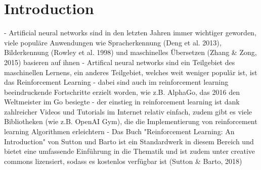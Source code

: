 \chapter{Introduction}

- Artificial neural networks sind in den letzten Jahren immer wichtiger geworden, viele populäre Anwendungen wie Spracherkennung (Deng et al. 2013), Bilderkennung (Rowley et al. 1998) und maschinelles Übersetzen (Zhang & Zong, 2015) basieren auf ihnen %
- Artifical neural networks sind ein Teilgebiet des maschinellen Lernens, ein anderes Teilgebiet, welches weit weniger populär ist, ist das Reinforcement Learning %
- dabei sind auch im reinforcement learning beeindruckende Fortschritte erzielt worden, wie z.B. AlphaGo, das 2016 den Weltmeister im Go besiegte %
- der einstieg in reinforcement learning ist dank zahlreicher Videos und Tutorials im Internet relativ einfach, zudem gibt es viele Bibliotheken (wie z.B. OpenAI Gym), die die Implementierung von reinforcement learning Algorithmen erleichtern %
- Das Buch "Reinforcement Learning: An Introduction" von Sutton und Barto ist ein Standardwerk in diesem Bereich und bietet eine umfassende Einführung in die Thematik und ist zudem unter creative commons lizensiert, sodass es kostenlos verfügbar ist (Sutton & Barto, 2018)

